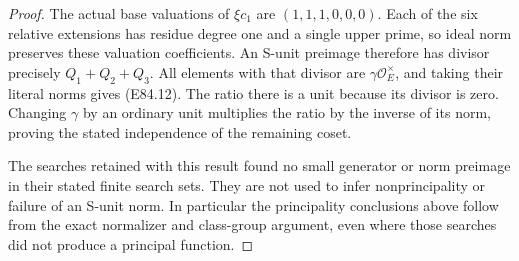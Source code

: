 \begin{proof}
The actual base valuations of \(\xi c_1\) are
\((1,1,1,0,0,0)\). Each of the six relative
extensions has residue degree one and a single
upper prime, so ideal norm preserves these
valuation coefficients. An S-unit preimage
therefore has divisor precisely
\(Q_1+Q_2+Q_3\). All elements with that divisor
are \(\gamma\mathcal O_E^\times\), and taking
their literal norms gives (E84.12). The ratio
there is a unit because its divisor is zero.
Changing \(\gamma\) by an ordinary unit multiplies
the ratio by the inverse of its norm, proving
the stated independence of the remaining coset.

The searches retained with this result found no
small generator or norm preimage in their stated
finite search sets. They are not used to infer
nonprincipality or failure of an S-unit norm.
In particular the principality conclusions
above follow from the exact normalizer and
class-group argument, even where those searches
did not produce a principal function.
\end{proof}
